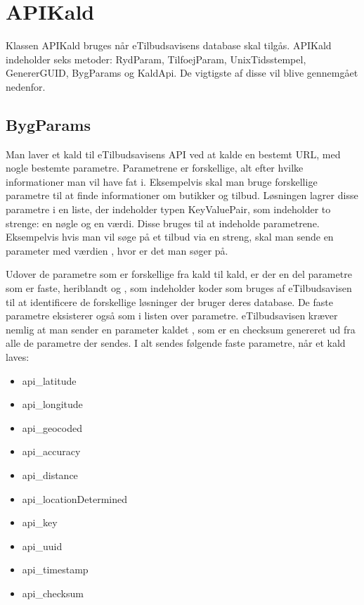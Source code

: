 \section{APIKald}
Klassen APIKald bruges når eTilbudsavisens database skal tilgås. APIKald indeholder seks metoder: RydParam, TilfoejParam, UnixTidsstempel, GenererGUID, BygParams og KaldApi. De vigtigste af disse vil blive gennemgået nedenfor. 

\subsection{BygParams}
Man laver et kald til eTilbudsavisens API ved at kalde en bestemt URL, med nogle bestemte parametre. Parametrene er forskellige, alt efter hvilke informationer man vil have fat i. Eksempelvis skal man bruge forskellige parametre til at finde informationer om butikker og tilbud. Løsningen lagrer disse parametre i en liste, der indeholder typen KeyValuePair, som indeholder to strenge: en nøgle og en værdi. Disse bruges til at indeholde parametrene. Eksempelvis hvis man vil søge på et tilbud via en streng, skal man sende en parameter  med værdien , hvor  er det man søger på.

Udover de parametre som er forskellige fra kald til kald, er der en del parametre som er faste, heriblandt  og , som indeholder koder som bruges af eTilbudsavisen til at identificere de forskellige løsninger der bruger deres database. De faste parametre eksisterer også som i listen over parametre. eTilbudsavisen kræver nemlig at man sender en parameter kaldet , som er en checksum genereret ud fra alle de parametre der sendes. I alt sendes følgende faste parametre, når et kald laves: 

\begin{itemize}
	\item api\_latitude
	\item api\_longitude
	\item api\_geocoded
	\item api\_accuracy
	\item api\_distance
	\item api\_locationDetermined
	\item api\_key
	\item api\_uuid
	\item api\_timestamp
	\item api\_checksum
\end{itemize}

